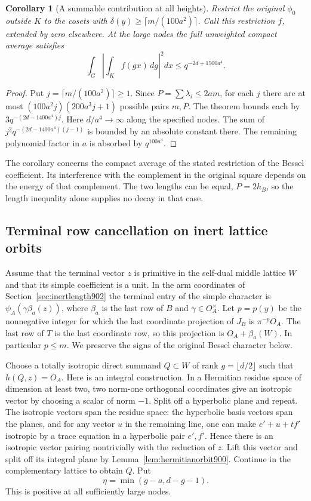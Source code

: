 \documentclass[a4paper,11pt]{article}
\newtheorem{corollary}[proposition]{Corollary}
\theoremstyle{definition}
\theoremstyle{remark}
\numberwithin{equation}{section}
\begin{document}
\begin{corollary}[A summable contribution at all heights]
\leavevmode\label{cor:inertsum902}
Restrict the original \(\phi_0\) outside \(K\) to the cosets
with \(\delta(y)\ge\lceil m/(100a^2)\rceil\). Call this
restriction \(f\), extended by zero elsewhere. At the large
nodes the full unweighted compact average satisfies
\[
         \int_G\left|\int_K f(gx)\,dg\right|^2dx
                       \le q^{-2d+1500a^4}.
\]
\end{corollary}
\begin{proof}
Put \(j=\lceil m/(100a^2)\rceil\ge1\).
Since \(P=\sum\lambda_i\le2am\), for each \(j\) there are at
most \((100a^2 j)(200a^3 j+1)\) possible pairs \(m,P\).
The theorem bounds each by \(3q^{-(2d-1400a^4)j}\).
Here \(d/a^4\to\infty\) along the specified nodes. The sum of
\(j^2 q^{-(2d-1400a^4)(j-1)}\) is bounded by an absolute constant
there. The remaining polynomial factor in \(a\) is absorbed by
\(q^{100a^4}\).
\end{proof}

The corollary concerns the compact average of the stated
restriction of the Bessel coefficient. Its interference with the
complement in the original square depends on the energy of that
complement. The two lengths can be equal, \(P=2h_B\), so the
length inequality alone supplies no decay in that case.
\clearpage

\subsection{Terminal row cancellation on inert lattice orbits}
\label{sec:inertterminal903}

Assume that the terminal vector \(z\) is primitive in the
self-dual middle lattice \(W\) and that its simple coefficient
is a unit. In the arm coordinates of Section~\ref{sec:inertlength902}
the terminal entry of the simple character is
\(\psi_A(\gamma\beta_a(z))\), where \(\beta_a\) is the last row
of \(B\) and \(\gamma\in O_A^\times\).
Let \(p=p(y)\) be the nonnegative integer for which the last
coordinate projection of \(J_B\) is \(\pi^{-p}O_A\).
The last row of \(T\) is the last coordinate row, so this
projection is \(O_A+\beta_a(W)\). In particular \(p\le m\).
We preserve the signs of the original Bessel character below.

Choose a totally isotropic direct summand \(Q\subset W\) of
rank \(g=\lfloor d/2\rfloor\) such that \(h(Q,z)=O_A\).
Here is an integral construction. In a Hermitian residue space
of dimension at least two, two norm-one orthogonal coordinates
give an isotropic vector by choosing a scalar of norm \(-1\).
Split off a hyperbolic plane and repeat. The isotropic vectors
span the residue space: the hyperbolic basis vectors span the
planes, and for any vector \(u\) in the remaining line, one can
make \(e'+u+t f'\) isotropic by a trace equation in a hyperbolic
pair \(e',f'\). Hence there is an isotropic vector pairing
nontrivially with the reduction of \(z\). Lift this vector and
split off its integral plane by Lemma~\ref{lem:hermitianorbit900}.
Continue in the complementary lattice to obtain \(Q\).
Put
\[
                         \eta=\min(g-a,d-g-1).
\]
This is positive at all sufficiently large nodes.
\end{document}
